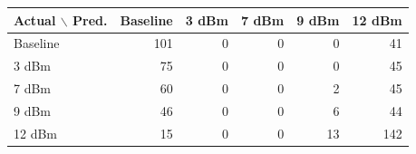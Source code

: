 \begin{tabular}{lrrrrr}
\toprule
Actual $\backslash$ Pred. & Baseline & 3 dBm & 7 dBm & 9 dBm & 12 dBm \\
\midrule
Baseline & 101 & 0 & 0 & 0 & 41 \\
3 dBm & 75 & 0 & 0 & 0 & 45 \\
7 dBm & 60 & 0 & 0 & 2 & 45 \\
9 dBm & 46 & 0 & 0 & 6 & 44 \\
12 dBm & 15 & 0 & 0 & 13 & 142 \\
\bottomrule
\end{tabular}
